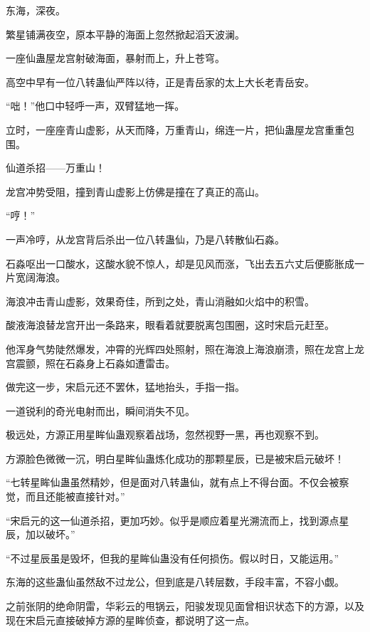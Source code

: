 
\begin{this_body}

东海，深夜。

繁星铺满夜空，原本平静的海面上忽然掀起滔天波澜。

一座仙蛊屋龙宫射破海面，暴射而上，升上苍穹。

高空中早有一位八转蛊仙严阵以待，正是青岳家的太上大长老青岳安。

“咄！”他口中轻呼一声，双臂猛地一挥。

立时，一座座青山虚影，从天而降，万重青山，绵连一片，把仙蛊屋龙宫重重包围。

仙道杀招——万重山！

龙宫冲势受阻，撞到青山虚影上仿佛是撞在了真正的高山。

“哼！”

一声冷哼，从龙宫背后杀出一位八转蛊仙，乃是八转散仙石淼。

石淼呕出一口酸水，这酸水貌不惊人，却是见风而涨，飞出去五六丈后便膨胀成一片宽阔海浪。

海浪冲击青山虚影，效果奇佳，所到之处，青山消融如火焰中的积雪。

酸液海浪替龙宫开出一条路来，眼看着就要脱离包围圈，这时宋启元赶至。

他浑身气势陡然爆发，冲霄的光辉四处照射，照在海浪上海浪崩溃，照在龙宫上龙宫震颤，照在石淼身上石淼如遭雷击。

做完这一步，宋启元还不罢休，猛地抬头，手指一指。

一道锐利的奇光电射而出，瞬间消失不见。

极远处，方源正用星眸仙蛊观察着战场，忽然视野一黑，再也观察不到。

方源脸色微微一沉，明白星眸仙蛊炼化成功的那颗星辰，已是被宋启元破坏！

“七转星眸仙蛊虽然精妙，但是面对八转蛊仙，就有点上不得台面。不仅会被察觉，而且还能被直接针对。”

“宋启元的这一仙道杀招，更加巧妙。似乎是顺应着星光溯流而上，找到源点星辰，加以破坏。”

“不过星辰虽是毁坏，但我的星眸仙蛊没有任何损伤。假以时日，又能运用。”

东海的这些蛊仙虽然敌不过龙公，但到底是八转层数，手段丰富，不容小觑。

之前张阴的绝命阴雷，华彩云的甩锅云，阳骏发现见面曾相识状态下的方源，以及现在宋启元直接破掉方源的星眸侦查，都说明了这一点。


\end{this_body}
